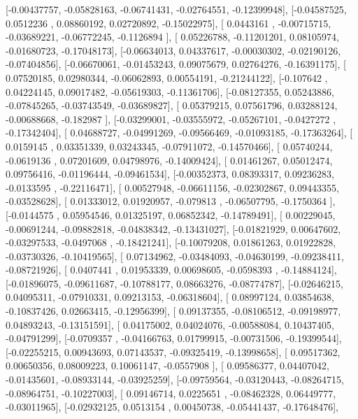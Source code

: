 \documentclass{article}
\begin{document}
       [-0.00437757, -0.05828163, -0.06741431, -0.02764551, -0.12399948],
       [-0.04587525,  0.0512236 ,  0.08860192,  0.02720892, -0.15022975],
       [ 0.0443161 , -0.00715715, -0.03689221, -0.06772245, -0.1126894 ],
       [ 0.05226788, -0.11201201,  0.08105974, -0.01680723, -0.17048173],
       [-0.06634013,  0.04337617, -0.00030302, -0.02190126, -0.07404856],
       [-0.06670061, -0.01453243,  0.09075679,  0.02764276, -0.16391175],
       [ 0.07520185,  0.02980344, -0.06062893,  0.00554191, -0.21244122],
       [-0.107642  ,  0.04224145,  0.09017482, -0.05619303, -0.11361706],
       [-0.08127355,  0.05243886, -0.07845265, -0.03743549, -0.03689827],
       [ 0.05379215,  0.07561796,  0.03288124, -0.00688668, -0.182987  ],
       [-0.03299001, -0.03555972, -0.05267101, -0.0427272 , -0.17342404],
       [ 0.04688727, -0.04991269, -0.09566469, -0.01093185, -0.17363264],
       [ 0.0159145 ,  0.03351339,  0.03243345, -0.07911072, -0.14570466],
       [ 0.05740244, -0.0619136 ,  0.07201609,  0.04798976, -0.14009424],
       [ 0.01461267,  0.05012474,  0.09756416, -0.01196444, -0.09461534],
       [-0.00352373,  0.08393317,  0.09236283, -0.0133595 , -0.22116471],
       [ 0.00527948, -0.06611156, -0.02302867,  0.09443355, -0.03528628],
       [ 0.01333012,  0.01920957, -0.079813  , -0.06507795, -0.1750364 ],
       [-0.0144575 ,  0.05954546,  0.01325197,  0.06852342, -0.14789491],
       [ 0.00229045, -0.00691244, -0.09882818, -0.04838342, -0.13431027],
       [-0.01821929,  0.00647602, -0.03297533, -0.0497068 , -0.18421241],
       [-0.10079208,  0.01861263,  0.01922828, -0.03730326, -0.10419565],
       [ 0.07134962, -0.03484093, -0.04630199, -0.09238411, -0.08721926],
       [ 0.0407441 ,  0.01953339,  0.00698605, -0.0598393 , -0.14884124],
       [-0.01896075, -0.09611687, -0.10788177,  0.08663276, -0.08774787],
       [-0.02646215,  0.04095311, -0.07910331,  0.09213153, -0.06318604],
       [ 0.08997124,  0.03854638, -0.10837426,  0.02663415, -0.12956399],
       [ 0.09137355, -0.08106512, -0.09198977,  0.04893243, -0.13151591],
       [ 0.04175002,  0.04024076, -0.00588084,  0.10437405, -0.04791299],
       [-0.0709357 , -0.04166763,  0.01799915, -0.00731506, -0.19399544],
       [-0.02255215,  0.00943693,  0.07143537, -0.09325419, -0.13998658],
       [ 0.09517362,  0.00650356,  0.08009223,  0.10061147, -0.0557908 ],
       [ 0.09586377,  0.04407042, -0.01435601, -0.08933144, -0.03925259],
       [-0.09759564, -0.03120443, -0.08264715, -0.08964751, -0.10227003],
       [ 0.09146714,  0.0225651 , -0.08462328,  0.06449777, -0.03011965],
       [-0.02932125,  0.0513154 ,  0.00450738, -0.05441437, -0.17648476],
\end{document}
